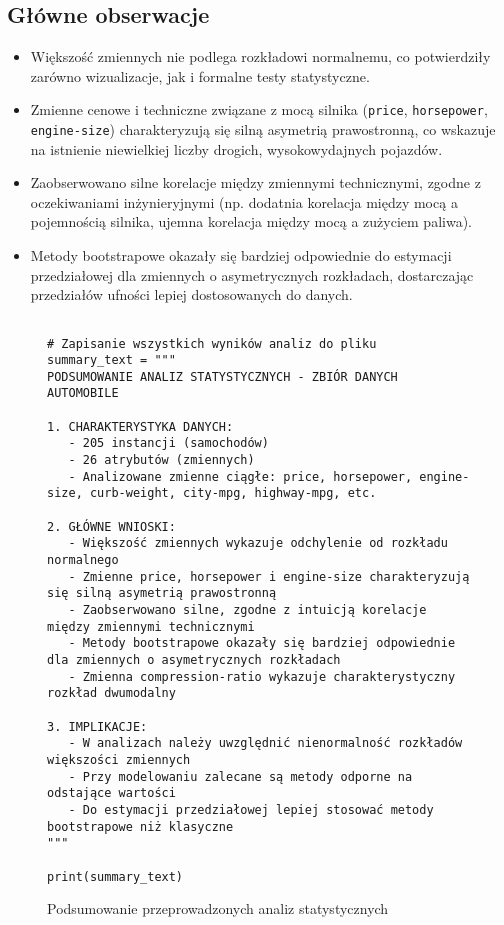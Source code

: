 \documentclass[12pt,a4paper]{article}
\newcommand{\kod}[2]{
    \begin{figure}[H]
        \begin{lstlisting}[style=pythonstyle]
#1
        \end{lstlisting}
        \caption{#2}
    \end{figure}
}
\begin{document}
\subsection{Główne obserwacje}

\begin{itemize}
    \item Większość zmiennych nie podlega rozkładowi normalnemu, co potwierdziły zarówno wizualizacje, jak i formalne testy statystyczne.
    
    \item Zmienne cenowe i techniczne związane z mocą silnika (\texttt{price}, \texttt{horsepower}, \texttt{engine-size}) charakteryzują się silną asymetrią prawostronną, co wskazuje na istnienie niewielkiej liczby drogich, wysokowydajnych pojazdów.
    
    \item Zaobserwowano silne korelacje między zmiennymi technicznymi, zgodne z oczekiwaniami inżynieryjnymi (np. dodatnia korelacja między mocą a pojemnością silnika, ujemna korelacja między mocą a zużyciem paliwa).
    
    \item Metody bootstrapowe okazały się bardziej odpowiednie do estymacji przedziałowej dla zmiennych o asymetrycznych rozkładach, dostarczając przedziałów ufności lepiej dostosowanych do danych.
\end{itemize}

\kod{
# Zapisanie wszystkich wyników analiz do pliku
summary_text = """
PODSUMOWANIE ANALIZ STATYSTYCZNYCH - ZBIÓR DANYCH AUTOMOBILE

1. CHARAKTERYSTYKA DANYCH:
   - 205 instancji (samochodów)
   - 26 atrybutów (zmiennych)
   - Analizowane zmienne ciągłe: price, horsepower, engine-size, curb-weight, city-mpg, highway-mpg, etc.

2. GŁÓWNE WNIOSKI:
   - Większość zmiennych wykazuje odchylenie od rozkładu normalnego
   - Zmienne price, horsepower i engine-size charakteryzują się silną asymetrią prawostronną
   - Zaobserwowano silne, zgodne z intuicją korelacje między zmiennymi technicznymi
   - Metody bootstrapowe okazały się bardziej odpowiednie dla zmiennych o asymetrycznych rozkładach
   - Zmienna compression-ratio wykazuje charakterystyczny rozkład dwumodalny

3. IMPLIKACJE:
   - W analizach należy uwzględnić nienormalność rozkładów większości zmiennych
   - Przy modelowaniu zalecane są metody odporne na odstające wartości
   - Do estymacji przedziałowej lepiej stosować metody bootstrapowe niż klasyczne
"""

print(summary_text)
}{Podsumowanie przeprowadzonych analiz statystycznych}
\end{document}
